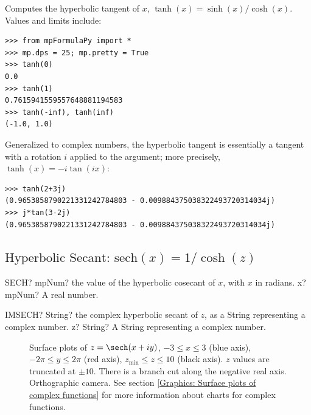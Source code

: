 Computes the hyperbolic tangent of $x$, $\tanh(x) = \sinh(x)/\cosh(x)$. Values and limits include:

\begin{lstlisting}
>>> from mpFormulaPy import *
>>> mp.dps = 25; mp.pretty = True
>>> tanh(0)
0.0
>>> tanh(1)
0.7615941559557648881194583
>>> tanh(-inf), tanh(inf)
(-1.0, 1.0)
\end{lstlisting}

Generalized to complex numbers, the hyperbolic tangent is essentially a tangent with a rotation $i$ applied to the argument; more precisely, $\tanh(x)=-i \tan(ix)$:

\begin{lstlisting}
>>> tanh(2+3j)
(0.9653858790221331242784803 - 0.009884375038322493720314034j)
>>> j*tan(3-2j)
(0.9653858790221331242784803 - 0.009884375038322493720314034j)
\end{lstlisting}



\newpage
\subsection{\texorpdfstring{$\text{Hyperbolic Secant: sech}(x) = 1/\cosh(z)$}{sech}}

\begin{mpFunctionsExtract}
	\mpWorksheetFunctionOneNotImplemented
	{SECH? mpNum? the value of the hyperbolic cosecant of $x$, with $x$ in radians.}
	{x? mpNum? A real number.}
\end{mpFunctionsExtract}


\vspace{0.6cm}
\begin{mpFunctionsExtract}
	\mpWorksheetFunctionOneNotImplemented
	{IMSECH? String? the complex hyperbolic secant of $z$, as a String representing a complex number.}
	{z? String? A String representing a complex number.}
\end{mpFunctionsExtract}


\begin{figure}[ht]%
	\centering
	\qquad
	\caption[Complex Hyperbolic Secant]{Surface plots of $z = \sech(x + iy)$, $-3 \leq x \leq 3$ (blue axis), $-2 \pi \leq y \leq 2\pi$ (red axis), $z_{\text{min}} \leq z \leq 10$ (black axis). $z$ values are truncated at $\pm 10$. There is a branch cut along the negative real axis. Orthographic camera. See section \ref{Graphics: Surface plots of complex functions} for more information about charts for complex functions.} 
	\label{fig:Complex Hyperbolic Secant}%
\end{figure}



